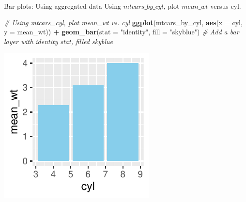 \documentclass[
  ignorenonframetext,
]{beamer}
\newenvironment{Shaded}{\begin{snugshade}}{\end{snugshade}}
\newcommand{\AttributeTok}[1]{\textcolor[rgb]{0.13,0.29,0.53}{#1}}
\newcommand{\CommentTok}[1]{\textcolor[rgb]{0.56,0.35,0.01}{\textit{#1}}}
\newcommand{\FunctionTok}[1]{\textcolor[rgb]{0.13,0.29,0.53}{\textbf{#1}}}
\newcommand{\NormalTok}[1]{#1}
\newcommand{\SpecialCharTok}[1]{\textcolor[rgb]{0.81,0.36,0.00}{\textbf{#1}}}
\newcommand{\StringTok}[1]{\textcolor[rgb]{0.31,0.60,0.02}{#1}}
\begin{document}
\begin{frame}[fragile]{Bar plots: Using aggregated data}
\label{bar-plots-using-aggregated-data-5}
Using \(mtcars\_by\_cyl\), plot \(mean\_wt\) versus cyl.


\begin{Shaded}
\begin{Highlighting}[]
\CommentTok{\# Using mtcars\_cyl, plot mean\_wt vs. cyl}
\FunctionTok{ggplot}\NormalTok{(mtcars\_by\_cyl, }\FunctionTok{aes}\NormalTok{(}\AttributeTok{x =}\NormalTok{ cyl, }\AttributeTok{y =}\NormalTok{ mean\_wt)) }\SpecialCharTok{+} \FunctionTok{geom\_bar}\NormalTok{(}\AttributeTok{stat =} \StringTok{"identity"}\NormalTok{,}
    \AttributeTok{fill =} \StringTok{"skyblue"}\NormalTok{)  }\CommentTok{\# Add a bar layer with identity stat, filled skyblue}
\end{Highlighting}
\end{Shaded}

\begin{center}\includegraphics[width=0.5\linewidth]{Figs/unnamed-chunk-109-1} \end{center}
\end{frame}
\end{document}
